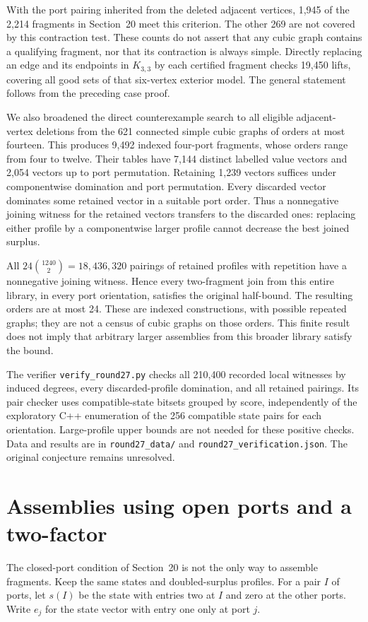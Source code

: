 \documentclass[11pt]{article}
\begin{document}
With the port pairing inherited from the deleted adjacent vertices,
1,945 of the 2,214 fragments in Section~20 meet this criterion.
The other 269 are not covered by this contraction test. These counts
do not assert that any cubic graph contains a qualifying fragment,
nor that its contraction is always simple. Directly replacing an
edge and its endpoints in $K_{3,3}$ by each certified fragment checks
19,450 lifts, covering all good sets of that six-vertex exterior
model. The general statement follows from the preceding case proof.

We also broadened the direct counterexample search to all eligible
adjacent-vertex deletions from the 621 connected simple cubic graphs
of orders at most fourteen. This produces 9,492 indexed four-port
fragments, whose orders range from four to twelve. Their tables have
7,144 distinct labelled value vectors and 2,054 vectors up to port
permutation. Retaining 1,239 vectors suffices under componentwise
domination and port permutation. Every discarded vector dominates
some retained vector in a suitable port order. Thus a nonnegative
joining witness for the retained vectors transfers to the discarded
ones: replacing either profile by a componentwise larger profile
cannot decrease the best joined surplus.

All $24\binom{1240}{2}=18,436,320$ pairings of retained profiles
with repetition have a nonnegative joining witness. Hence every
two-fragment join from this entire library, in every port orientation,
satisfies the original half-bound. The resulting orders are at most
24. These are indexed constructions, with possible repeated graphs;
they are not a census of cubic graphs on those orders. This finite
result does not imply that arbitrary larger assemblies from this
broader library satisfy the bound.

The verifier \texttt{verify\_round27.py} checks all 210,400 recorded
local witnesses by induced degrees, every discarded-profile domination,
and all retained pairings. Its pair checker uses compatible-state
bitsets grouped by score, independently of the exploratory C++
enumeration of the 256 compatible state pairs for each orientation.
Large-profile upper bounds are not needed for these positive checks.
Data and results are in \texttt{round27\_data/} and
\texttt{round27\_verification.json}. The original conjecture remains
unresolved.

\section{Assemblies using open ports and a two-factor}
The closed-port condition of Section~20 is not the only way to
assemble fragments. Keep the same states and doubled-surplus
profiles. For a pair $I$ of ports, let $s(I)$ be the state with
entries two at $I$ and zero at the other ports. Write $e_j$ for
the state vector with entry one only at port $j$.
\end{document}
